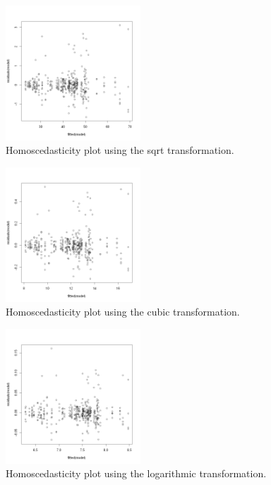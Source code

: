 \documentclass[conference]{IEEEtran}
\begin{document}
\begin{figure}[H]
    \label{int-scene-os}
    \centering
    \includegraphics[width=0.45\textwidth]{images/image5.png}
    \caption{Homoscedasticity plot using the sqrt transformation.}
\end{figure}

\begin{figure}[H]
    \label{int-scene-os}
    \centering
    \includegraphics[width=0.45\textwidth]{images/image6.png}
    \caption{Homoscedasticity plot using the cubic transformation.}
\end{figure}

\begin{figure}[H]
    \label{int-scene-os}
    \centering
    \includegraphics[width=0.45\textwidth]{images/image7.png}
    \caption{Homoscedasticity plot using the logarithmic transformation.}
\end{figure}
\end{document}
